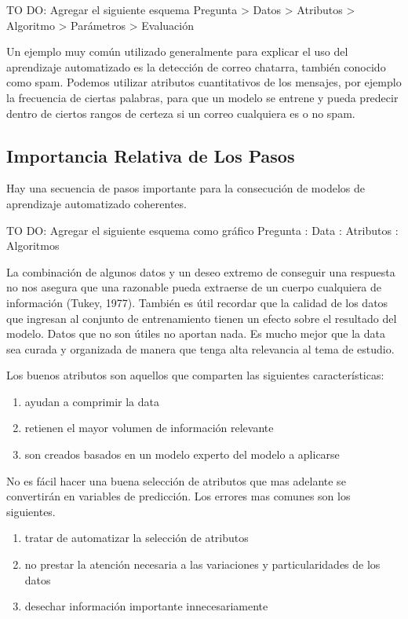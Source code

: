 \begin{spacing}{1.5}
TO DO: Agregar el siguiente esquema
Pregunta > Datos > Atributos > Algoritmo > Parámetros > Evaluación

Un ejemplo muy común utilizado generalmente para explicar el uso del aprendizaje automatizado es la detección de correo chatarra, también conocido como spam. Podemos utilizar atributos cuantitativos de los mensajes, por ejemplo la frecuencia de ciertas palabras, para que un modelo se entrene y pueda predecir dentro de ciertos rangos de certeza si un correo cualquiera es o no spam. 

\subsection{Importancia Relativa de Los Pasos}

Hay una secuencia de pasos importante para la consecución de modelos de aprendizaje automatizado coherentes.

TO DO: Agregar el siguiente esquema como gráfico
Pregunta : Data : Atributos : Algoritmos

La combinación de algunos datos y un deseo extremo de conseguir una respuesta no nos asegura que una razonable pueda extraerse de un cuerpo cualquiera de información (Tukey, 1977). También es útil recordar que la calidad de los datos que ingresan al conjunto de entrenamiento tienen un efecto sobre el resultado del modelo. Datos que no son útiles no aportan nada. Es mucho mejor que la data sea curada y organizada de manera que tenga alta relevancia al tema de estudio. 

Los buenos atributos son aquellos que comparten las siguientes características:

\begin{enumerate}
	\item ayudan a comprimir la data
	\item retienen el mayor volumen de información relevante
	\item son creados basados en un modelo experto del modelo a aplicarse
\end{enumerate}

No es fácil hacer una buena selección de atributos que mas adelante se convertirán en variables de predicción. Los errores mas comunes son los siguientes. 

\begin{enumerate}
	\item tratar de automatizar la selección de atributos
	\item no prestar la atención necesaria a las variaciones y particularidades de los datos
	\item desechar información importante innecesariamente
\end{enumerate}


\end{spacing}
